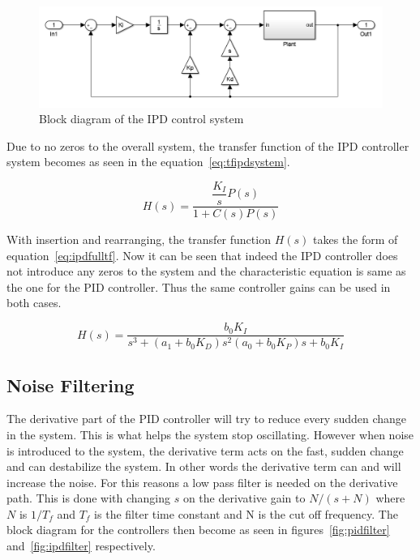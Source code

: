\begin{figure}[!h]
	\centering
	\includegraphics[width=.85\linewidth]{graphics/ipdcontroller}
	\caption{Block diagram of the IPD control system}
	\label{fig:ipdcontrolsystem}	
\end{figure}

Due to no zeros to the overall system, the transfer function of the IPD controller system becomes as seen in the equation~\ref{eq:tfipdsystem}.

\begin{equation}
\label{eq:tfipdsystem}
H(s) = \dfrac{\dfrac{K_I}{s} P(s)}{1+C(s)P(s)}
\end{equation}

With insertion and rearranging, the transfer function $H(s)$ takes the form of equation~\ref{eq:ipdfulltf}. Now it can be seen that indeed the IPD controller does not introduce any zeros to the system and the characteristic equation is same as the one for the PID controller. Thus the same controller gains can be used in both cases.

\begin{equation}
\label{eq:ipdfulltf}
H(s) = \dfrac{b_0 K_I}{s^3 + (a_1 + b_0 K_D)s^2 (a_0 + b_0 K_P)s + b_0 K_I }
\end{equation}

\subsection{Noise Filtering}

The derivative part of the PID controller will try to reduce every sudden change in the system. This is what helps the system stop oscillating. However when noise is introduced to the system, the derivative term acts on the fast, sudden change and can destabilize the system. In other words the derivative term can and will increase the noise. For this reasons a low pass filter is needed on the derivative path. This is done with changing $s$ on the derivative gain to $N/(s + N)$ where $N$ is $1/T_f$ and $T_f$ is the filter time constant and N is the cut off frequency. The block diagram for the controllers then become as seen in figures~\ref{fig:pidfilter} and~\ref{fig:ipdfilter} respectively.

